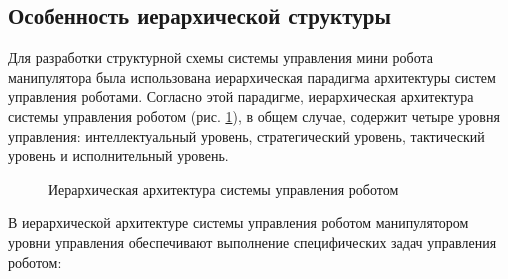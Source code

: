 \subsection{Особенность иерархической структуры}
Для разработки структурной схемы системы управления мини робота манипулятора была использована иерархическая парадигма архитектуры систем управления роботами. Согласно этой парадигме, иерархическая архитектура системы управления роботом (рис. \ref{Hierar}), в общем случае, содержит четыре уровня управления: интеллектуальный уровень, стратегический уровень, тактический уровень и исполнительный уровень.

\begin{figure}[H]
	\centering
	
	\caption{Иерархическая архитектура системы управления роботом}
	\label{Hierar}
\end{figure}

В иерархической архитектуре системы управления роботом манипулятором уровни управления обеспечивают выполнение специфических задач управления роботом:


